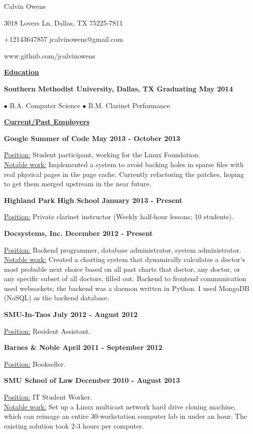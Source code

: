 \documentclass[11pt]{article}
\begin{document}
\centerline{{\Huge \sc Calvin Owens}}
\centerline{3018 Lovers Ln, Dallas, TX 75225-7811}
\centerline{+12143647857 \textbullet \hspace{1pt} jcalvinowens@gmail.com}
\centerline{www.github.com/jcalvinowens}

\noindent
\hrulefill

\centerline{\underline{\bf Education}}
\bigskip
\centerline{\bf Southern Methodist University, Dallas, TX \hfill Graduating May 2014}
\centerline{\hfill $\bullet$ B.A. Computer Science \hfill $\bullet$ B.M. Clarinet Performance \hfill}

\noindent
\hrulefill

\centerline{\underline{\bf Current/Past Employers}}
\bigskip
\noindent\centerline{\bf Google Summer of Code \hfill May 2013 - October 2013}
\underline{Position:} Student participant, working for the Linux Foundation. \\
\underline{Notable work:} Implemented a system to avoid backing holes in sparse
files with real physical pages in the page cache. Currently refactoring the
patches, hoping to get them merged upstream in the near future.
\vspace*{6pt}\\
\noindent\centerline{\bf Highland Park High School \hfill January 2013 - Present}
\underline{Position:} Private clarinet instructor (Weekly half-hour lessons; 10 students).
\vspace*{6pt}\\
\noindent\centerline{\bf Docsystems, Inc. \hfill December 2012 - Present}
\underline{Position:} Backend programmer, database administrator, system administrator. \\
\underline{Notable work:} Created a charting system that dynamically calculates
a doctor's most probable next choice based on all past charts that doctor, any
doctor, or any specific subset of all doctors, filled out. Backend to frontend
communication used websockets; the backend was a daemon written in Python. I
used MongoDB (NoSQL) as the backend database.
\vspace*{6pt}\\
\noindent\centerline{\bf SMU-In-Taos \hfill July 2012 - August 2012}
\underline{Position:} Resident Assistant.
\vspace*{6pt}\\
\noindent\centerline{\bf Barnes \& Noble \hfill April 2011 - September 2012}
\underline{Position:} Bookseller.
\vspace*{6pt}\\
\noindent\centerline{\bf SMU School of Law \hfill December 2010 - August 2013}
\underline{Position:} IT Student Worker. \\
\underline{Notable work:} Set up a Linux multicast network hard drive cloning
machine, which can reimage an entire 30-workstation computer lab in under an
hour. The existing solution took 2-3 hours per computer.
\end{document}
